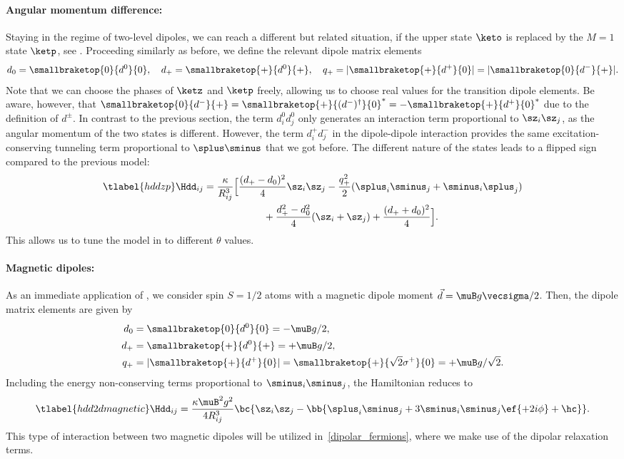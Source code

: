 \paragraph{Angular momentum difference:}
Staying in the regime of two-level dipoles, we can reach a different but related situation, if the upper state $\keto$ is replaced by the $M=1$ state $\ketp$, see .
Proceeding similarly as before, we define the relevant dipole matrix elements
\begin{align}
    d_0 = \smallbraketop{0}{d^0}{0},\quad
    d_+ = \smallbraketop{+}{d^0}{+},\quad
    q_+ = |\smallbraketop{+}{d^+}{0}| = |\smallbraketop{0}{d^-}{+}|.
\end{align}
Note that we can choose the phases of $\ketz$ and $\ketp$ freely, allowing us to choose real values for the transition dipole elements. Be aware, however, that $\smallbraketop{0}{d^-}{+} = \smallbraketop{+}{(d^-)^\dag}{0}^* = -\smallbraketop{+}{d^+}{0}^*$ due to the definition of $d^\pm$.
In contrast to the previous section, the term $d^0_i d^0_j$ only generates an interaction term proportional to $\sz_i \sz_j$, as the angular momentum of the two states is different. However, the term $d^+_i d^-_j$ in the dipole-dipole interaction provides the same excitation-conserving tunneling term proportional to $\splus\sminus$ that we got before. The different nature of the states leads to a flipped sign compared to the previous model:
\begin{align} \tlabel{hddzp}
    \Hdd_{ij} &= \frac{\kappa}{R_{ij}^3} \Big[ \frac{(d_+-d_0)^2}{4} \sz_i \sz_j  - \frac{q_+^2}{2} (\splus_i \sminus_j + \sminus_i \splus_j) \\
              &\qquad\qquad\qquad + \frac{d_+^2 - d_0^2}{4} (\sz_i + \sz_j)  + \frac{(d_++d_0)^2}{4} \Big].
\end{align}
This allows us to tune the model in  to different $\theta$ values.

\paragraph{Magnetic dipoles:}
As an immediate application of , we consider spin $S=1/2$ atoms with a
magnetic dipole moment $\vec{d}=\muB g \vecsigma / 2$.
Then, the dipole matrix elements are given by
\begin{align}
    d_0 &= \smallbraketop{0}{d^0}{0} = -\muB g/2, \vphantom{\sqrt{2}} \\
    d_+ &= \smallbraketop{+}{d^0}{+} = +\muB g/2, \vphantom{\sqrt{2}} \\
    q_+ &= |\smallbraketop{+}{d^+}{0}| = \smallbraketop{+}{\sqrt{2} \sigma^+}{0} = +\muB g/\sqrt{2}.
\end{align}
Including the energy non-conserving terms proportional to $\sminus_i\sminus_j$, the Hamiltonian reduces to
\begin{align} \tlabel{hdd2dmagnetic}
    \Hdd_{ij} = \frac{\kappa \muB^2 g^2}{4 R_{ij}^3} \bc{ \sz_i \sz_j - \bb{\splus_i \sminus_j+ 3 \sminus_i\sminus_j \ef{+2i\phi} + \hc } }.
\end{align}
This type of interaction between two magnetic dipoles will be utilized in~\cref{dipolar_fermions}, where we make use of the dipolar relaxation terms.


